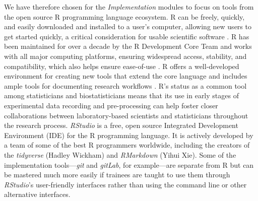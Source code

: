 \documentclass[pdftex,english,11.5pt,parskip=half]{scrartcl}
\begin{document}
We have therefore chosen for the \textit{Implementation} 
modules to focus on tools from the open source R programming language ecosystem. R can be
freely, quickly, and easily downloaded and installed to a user's computer,
allowing new users to get started quickly, a critical consideration for usable
scientific software \cite{list2017ten}. R has been maintained for over a decade
by the R Development Core Team and works with all major computing platforms,
ensuring  widespread access, stability, and compatibility, which also helps ensure
ease-of-use \cite{baumer2018lessons, altschul2013anatomy}. R offers a
well-developed environment for creating new tools that extend the core language
\cite{wickham2015r, gentleman2004bioconductor} and includes ample tools for documenting research workflows
\cite{xie2015dynamic, xie2016bookdown}. R's status as a common tool among statisticians and biostatisticians means that its use in early stages of
experimental data recording and pre-processing can help foster closer
collaborations between laboratory-based scientists and statisticians throughout
the research process. \textit{RStudio} is a free, open source Integrated Development Environment (IDE) for the R programming language. It is actively developed by a team of some of the best R programmers worldwide, including the creators of the \textit{tidyverse} (Hadley Wickham) and \textit{RMarkdown} (Yihui Xie). Some
of the implementation tools---\textit{git} and \textit{gitLab}, for example---are separate from R
but can be mastered much more easily if trainees are taught to use them through
\textit{RStudio}'s user-friendly interfaces rather than using the command line or other
alternative interfaces. 
\end{document}
